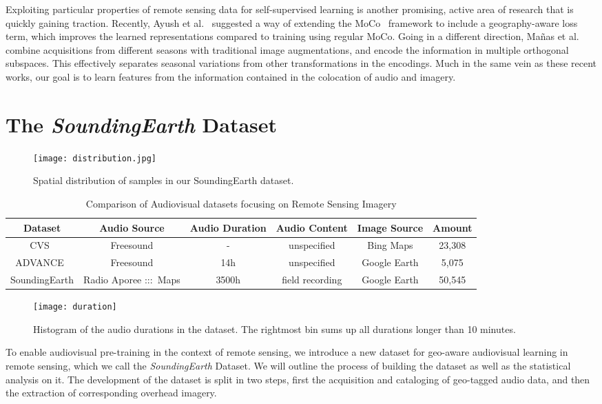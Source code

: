 \documentclass[journal]{IEEEtran}
\begin{document}
Exploiting particular properties of remote sensing data
for self-supervised learning
is another promising, active area of research
that is quickly gaining traction.
Recently, Ayush et al.~\cite{ayush_geography-aware_2020}
suggested a way of extending
the MoCo~\cite{he_momentum_2020} framework to include
a geography-aware loss term,
which improves the learned representations
compared to training using regular MoCo.
Going in a different direction, Ma\~nas et al.~\cite{manas_seasonal_2021}
combine acquisitions from different seasons with
traditional image augmentations,
and encode the information in multiple orthogonal subspaces.
This effectively separates seasonal variations from
other transformations in the encodings.
Much in the same vein as these recent works,
our goal is to learn features from the information contained in
the colocation of audio and imagery.

\section{The \emph{SoundingEarth} Dataset}\label{sect:dataset}
\begin{figure}
  \center
  \texttt{[image: distribution.jpg]}
  \caption{Spatial distribution of samples in
      our SoundingEarth dataset.
  }
  \label{fig:distribution}
\end{figure}

\begin{table*}[t]
  \centering
  \caption{Comparison of Audiovisual datasets focusing on Remote Sensing Imagery}
  \begin{tabular}{cccccc}
    \toprule[1pt]
    Dataset & Audio Source & Audio Duration & Audio Content & Image Source & Amount \\
    \midrule[1pt]
    CVS~\cite{salem2018multimodal}& Freesound & - & unspecified & Bing Maps & 23,308\\
    ADVANCE~\cite{hu_cross-task_2020}& Freesound & 14h& unspecified & Google Earth & 5,075\\
    SoundingEarth & Radio Aporee :::~Maps &  3500h & field recording & Google Earth & 50,545\\
    \bottomrule[1pt]
  \end{tabular}
  \vspace{6pt}
  \label{tabel:compare}
\end{table*}
\begin{figure}
  \texttt{[image: duration]}
  \caption{Histogram of the audio durations in the dataset. The rightmost bin sums up all durations longer than 10 minutes.
  }
  \label{fig:duration}
\end{figure}
To enable audiovisual pre-training in the context of remote sensing,
we introduce a new dataset for geo-aware audiovisual learning in remote sensing, which we call the \emph{SoundingEarth} Dataset. We will outline the process of building the dataset as well as the statistical analysis on it. The development of the dataset is split in two steps, first the acquisition and cataloging of geo-tagged audio data, and then the extraction of corresponding overhead imagery.
\end{document}
